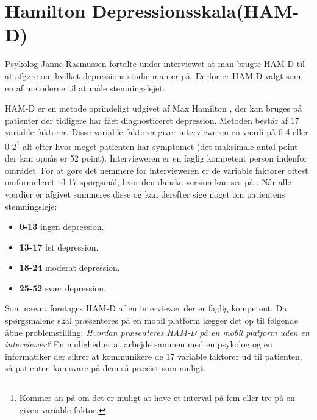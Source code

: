 \section{Hamilton Depressionsskala(HAM-D)}
Psykolog Janne Rasmussen fortalte under interviewet at man brugte HAM-D til at afgøre om hvilket depressions stadie man er på.\cite[Afsnit 1.3]{faelles}
Derfor er HAM-D valgt som en af metoderne til at måle stemningslejet.

HAM-D er en metode oprindeligt udgivet af Max Hamilton \cite{ham_d}, der kan bruges på patienter der tidligere har fået diagnosticeret depression. 
Metoden består af 17 variable faktorer.
Disse variable faktorer giver intervieweren en værdi på 0-4 eller 0-2\footnote{Kommer an på om det er muligt at have et interval på fem eller tre på en given variable faktor.} alt efter hvor meget patienten har symptomet (det maksimale antal point der kan opnås er 52 point).
Intervieweren er en faglig kompetent person indenfor området.
For at gøre det nemmere for intervieweren er de variable faktorer oftest omformuleret til 17 spørgsmål, hvor den danske version kan ses på \citet{ham_d_dansk}.
Når alle værdier er afgivet summeres disse og kan derefter sige noget om patientens stemningsleje:
\begin{itemize}
	\item \textbf{0-13} ingen depression.
	\item \textbf{13-17} let depression.
	\item \textbf{18-24} moderat depression.
	\item \textbf{25-52} svær depression.
\end{itemize}

Som nævnt foretages HAM-D af en interviewer der er faglig kompetent.
Da spørgsmålene skal præsenteres på en mobil platform lægger det op til følgende åbne problemstilling: \textit{Hvordan præsenteres HAM-D på en mobil platform uden en interviewer?}
En mulighed er at arbejde sammen med en psykolog og en informatiker der sikrer at kommunikere de 17 variable faktorer ud til patienten, så patienten kan svare på dem så præcist som muligt.
